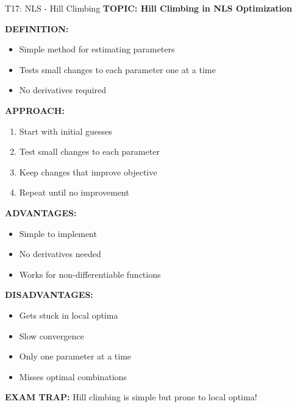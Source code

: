 \documentclass[8pt]{beamer}
\begin{document}
	\begin{frame}{T17: NLS - Hill Climbing}
		\fontsize{6.5}{7.5}\selectfont
		\textbf{TOPIC: Hill Climbing in NLS Optimization}
		
		\vspace{0.1cm}
		\textbf{DEFINITION:}
		\begin{itemize}
			\item Simple method for estimating parameters
			\item Tests small changes to each parameter one at a time
			\item No derivatives required
		\end{itemize}
		
		\vspace{0.1cm}
		\textbf{APPROACH:}
		\begin{enumerate}
			\item Start with initial guesses
			\item Test small changes to each parameter
			\item Keep changes that improve objective
			\item Repeat until no improvement
		\end{enumerate}
		
		\vspace{0.1cm}
		\textbf{ADVANTAGES:}
		\begin{itemize}
			\item Simple to implement
			\item No derivatives needed
			\item Works for non-differentiable functions
		\end{itemize}
		
		\vspace{0.1cm}
		\textbf{DISADVANTAGES:}
		\begin{itemize}
			\item Gets stuck in local optima
			\item Slow convergence
			\item Only one parameter at a time
			\item Misses optimal combinations
		\end{itemize}
		
		\textcolor{myred}{\textbf{EXAM TRAP:}} Hill climbing is \textcolor{myblue}{simple but prone to local optima}!
	\end{frame}
	
\end{document}
